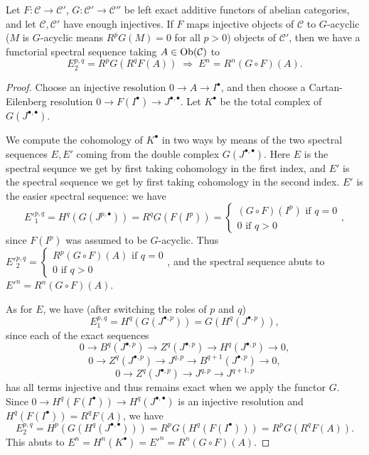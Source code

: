 \begin{thm}\label{spectral} Let $F: \mathcal{C}\rightarrow \mathcal{C}'$, $G:\mathcal{C'}\rightarrow \mathcal{C''}$ be left exact additive functors of abelian categories, and let $\mathcal{C}, \mathcal{C'}$ have enough injectives. If $F$ maps injective objects of $\mathcal{C}$ to $G$-acyclic ($M$ is $G$-acyclic means $R^pG(M) = 0$ for all $p > 0$) objects of $\mathcal{C}'$, then we have a functorial spectral sequence taking $A\in \mbox{\rm Ob}(\mathcal{C})$ to
\[
E^{p,q}_2 = R^pG(R^qF(A)) \; \Rightarrow \; E^n = R^n(G\circ F)(A).
\]
\end{thm}
\begin{proof} Choose an injective resolution $0 \rightarrow A \rightarrow I^\bullet$, and then choose a Cartan-Eilenberg resolution $0 \rightarrow F(I^\bullet) \rightarrow J^{\bullet,\bullet}$. Let $K^\bullet$ be the total complex of $G(J^{\bullet,\bullet})$.

We compute the cohomology of $K^\bullet$ in two ways by means of the two spectral sequences $E,E'$ coming from the double complex $G(J^{\bullet,\bullet})$. Here $E$ is the spectral sequnce we get by first taking cohomology in the first index, and $E'$ is the spectral sequence we get by first taking cohomology in the second index. $E'$ is the easier spectral sequence: we have
\[
E'^{p,q}_1 = H^q(G(J^{p,\bullet})) = R^qG(F(I^p)) = \begin{cases}(G\circ F)(I^p) \mbox{ if } q = 0\\
0 \mbox{ if } q > 0\end{cases},
\]
since $F(I^p)$ was assumed to be $G$-acyclic. Thus $E'^{p,q}_2 = \begin{cases}R^p(G\circ F)(A) \mbox{ if } q = 0\\ 0 \mbox{ if } q > 0\end{cases}$, and the spectral sequence abuts to $E'^n = R^n(G\circ F)(A)$.

As for $E$, we have (after switching the roles of $p$ and $q$)
\[
E^{p,q}_1 = H^q(G(J^{\bullet,p})) = G(H^q(J^{\bullet,p})),
\]
since each of the exact sequences
\[
0 \rightarrow B^q(J^{\bullet,p}) \rightarrow Z^q(J^{\bullet,p}) \rightarrow H^q(J^{\bullet,p}) \rightarrow 0,
\]
\[
0 \rightarrow Z^q(J^{\bullet,p}) \rightarrow J^{q,p} \rightarrow B^{q+1}(J^{\bullet,p}) \rightarrow 0,
\]
\[
0 \rightarrow Z^q(J^{\bullet,p}) \rightarrow J^{q,p} \rightarrow J^{q+1,p}
\]
has all terms injective and thus remains exact when we apply the functor $G$. Since $0 \rightarrow H^q(F(I^\bullet)) \rightarrow H^q(J^{\bullet,\bullet})$ is an injective resolution and $H^q(F(I^\bullet)) = R^qF(A)$, we have
\[
E^{p,q}_2 = H^p(G(H^q(J^{\bullet,\bullet}))) = R^pG(H^q(F(I^\bullet))) = R^pG(R^qF(A)).
\]
This abuts to $E^n = H^n(K^\bullet) = E'^n = R^n(G\circ F)(A)$.
\end{proof}

